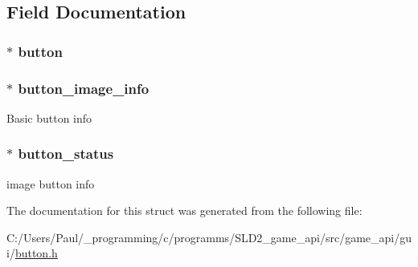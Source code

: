 \subsection{Field Documentation}
\hypertarget{struct___image___button_afcbb5b54142bac4e305b31cbebe41064}{
\subsubsection[{button}]{$\ast$ button}}\label{struct___image___button_afcbb5b54142bac4e305b31cbebe41064}
\hypertarget{struct___image___button_abe7ec1033c8966c23ea31920649178bf}{
\subsubsection[{button\+\_\+image\+\_\+info}]{$\ast$ button\+\_\+image\+\_\+info}}\label{struct___image___button_abe7ec1033c8966c23ea31920649178bf}
Basic button info \hypertarget{struct___image___button_af1ab6c7287e67a55a8e855e08302f8be}{
\subsubsection[{button\+\_\+status}]{$\ast$ button\+\_\+status}}\label{struct___image___button_af1ab6c7287e67a55a8e855e08302f8be}
image button info 

The documentation for this struct was generated from the following file\+:\begin{DoxyCompactItemize}
\item 
C\+:/\+Users/\+Paul/\+\_\+programming/c/programms/\+S\+L\+D2\+\_\+game\+\_\+api/src/game\+\_\+api/gui/\hyperlink{button_8h}{button.\+h}\end{DoxyCompactItemize}
